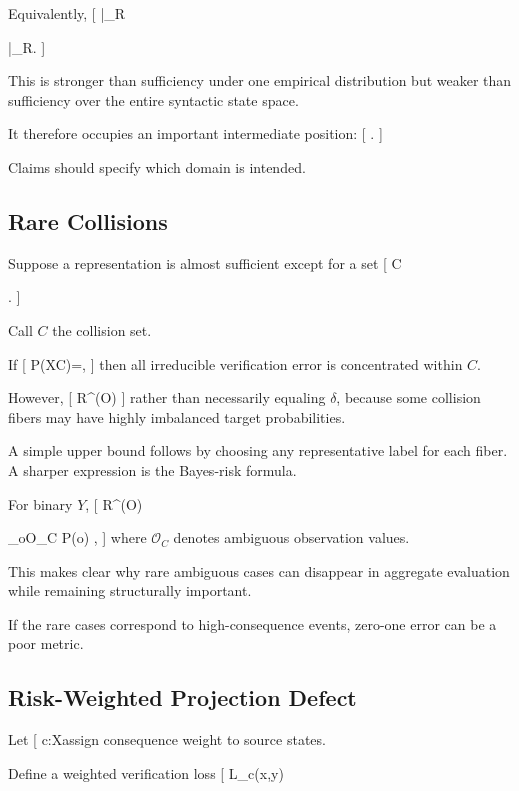 \documentclass[11pt]{article}
\begin{document}
Equivalently,
[
\Phi|_{\mathcal R}

\widehat{\Phi}
\circ
\pi|_{\mathcal R}.
]

This is stronger than sufficiency under one empirical distribution but weaker than sufficiency over the entire syntactic state space.

It therefore occupies an important intermediate position:
[
\subseteq
{}
\subseteq
{}.
]

Claims should specify which domain is intended.

\subsection{Rare Collisions}

Suppose a representation is almost sufficient except for a set
[
C

.
]

Call $C$ the collision set.

If
[
P(X\in C)=\delta,
]
then all irreducible verification error is concentrated within $C$.

However,
[
R^\star(O)
\leq\delta
]
rather than necessarily equaling $\delta$, because some collision fibers may have highly imbalanced target probabilities.

A simple upper bound follows by choosing any representative label for each fiber. A sharper expression is the Bayes-risk formula.

For binary $Y$,
[
R^\star(O)

\sum_{o\in\mathcal O_C}
P(o)
,
]
where $\mathcal O_C$ denotes ambiguous observation values.

This makes clear why rare ambiguous cases can disappear in aggregate evaluation while remaining structurally important.

If the rare cases correspond to high-consequence events, zero-one error can be a poor metric.

\subsection{Risk-Weighted Projection Defect}

Let
[
c:\mathcal X\to[0,\infty)
]
assign consequence weight to source states.

Define a weighted verification loss
[
L_c(x,\hat y)
\end{document}
